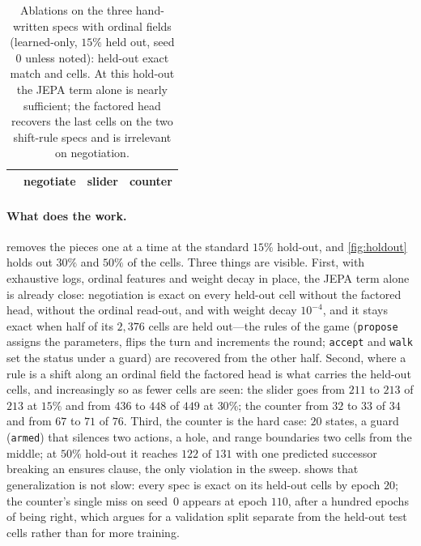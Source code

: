 \documentclass{article}
\theoremstyle{plain}
\theoremstyle{definition}
\theoremstyle{remark}
\begin{document}
\begin{table}[t]
\centering
\caption{Ablations on the three hand-written specs with ordinal fields (learned-only, $15\%$ held out, seed 0 unless noted): held-out exact match and cells. At this hold-out the JEPA term alone is nearly sufficient; the factored head recovers the last cells on the two shift-rule specs and is irrelevant on negotiation.}
\label{tab:ablate}
\footnotesize
\setlength{\tabcolsep}{4pt}
\begin{tabular}{lccc}
\toprule
 & negotiate & slider & counter\\
\midrule

\end{tabular}
\end{table}

\paragraph{What does the work.}  removes the pieces one at a time at the standard $15\%$ hold-out, and \cref{fig:holdout} holds out $30\%$ and $50\%$ of the cells. Three things are visible. First, with exhaustive logs, ordinal features and weight decay in place, the JEPA term alone is already close: negotiation is exact on every held-out cell without the factored head, without the ordinal read-out, and with weight decay $10^{-4}$, and it stays exact when half of its $2{,}376$ cells are held out---the rules of the game (\texttt{propose} assigns the parameters, flips the turn and increments the round; \texttt{accept} and \texttt{walk} set the status under a guard) are recovered from the other half. Second, where a rule is a shift along an ordinal field the factored head is what carries the held-out cells, and increasingly so as fewer cells are seen: the slider goes from $211$ to $213$ of $213$ at $15\%$ and from $436$ to $448$ of $449$ at $30\%$; the counter from $32$ to $33$ of $34$ and from $67$ to $71$ of $76$. Third, the counter is the hard case: $20$ states, a guard (\texttt{armed}) that silences two actions, a hole, and range boundaries two cells from the middle; at $50\%$ hold-out it reaches $122$ of $131$ with one predicted successor breaking an ensures clause, the only violation in the sweep.  shows that generalization is not slow: every spec is exact on its held-out cells by epoch $20$; the counter's single miss on seed~$0$ appears at epoch $110$, after a hundred epochs of being right, which argues for a validation split separate from the held-out test cells rather than for more training.
\end{document}
